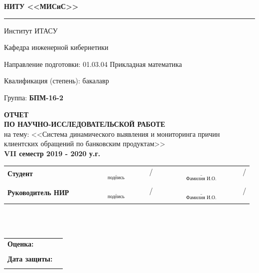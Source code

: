 \documentclass[a4paper,12pt,preview]{report} %
\newcommand{\doublerule}[1][.4pt]{%
	\noindent
	\makebox[0pt][l]{\rule[.7ex]{\linewidth}{#1}}%
	\rule[.3ex]{\linewidth}{#1}}
\begin{document}
	\linespread{1.3}
	
	
	\begin{center}
		\textbf{НИТУ <<МИСиС>>}
	\end{center}

	\doublerule
	
	\noindent
	Институт ИТАСУ
	
	\noindent
	Кафедра инженерной кибернетики
	
	\noindent
	Направление подготовки: 01.03.04 Прикладная математика
	
	\noindent
	Квалификация (степень): бакалавр
	
	\noindent
	Группа: \textbf{БПМ-16-2}
	
	\hfill \break
	
	\begin{center}
		\huge\textbf{ОТЧЕТ}\\
		\large\textbf{ПО НАУЧНО-ИССЛЕДОВАТЕЛЬСКОЙ РАБОТЕ} \\
		на тему: <<Система динамического выявления и мониторинга причин клиентских обращений по банковским продуктам>>\\
		\textbf{VII семестр 2019 - 2020 у.г.}
	\end{center}
	
	\hfill \break
	\hfill \break
	\normalsize{ 
		\begin{tabular}{lccc}
			\textbf{Студент} &  \text{ } & $\underset{\text{подпись}}{\underline{\hspace{4cm}}}$/ & $\underset{\text{Фамилия И.О.}}{\underline{\hspace{5cm}}}$/ \\\\
			\textbf{Руководитель НИР} &  \text{ } & $\underset{\text{подпись}}{\underline{\hspace{4cm}}}$/ & $\underset{\text{Фамилия И.О.}}{\underline{\hspace{5cm}}}$/ \\\\
		\end{tabular}
	}\\\\
	
	\noindent
	\normalsize{ 
		\begin{tabular}{lc}
			\textbf{Оценка:} &  \underline{\hspace{7cm}}\\\\
			\textbf{Дата защиты:} & \underline{\hspace{7cm}}\\\\
		\end{tabular}
	}\\\\
	
\end{document}
